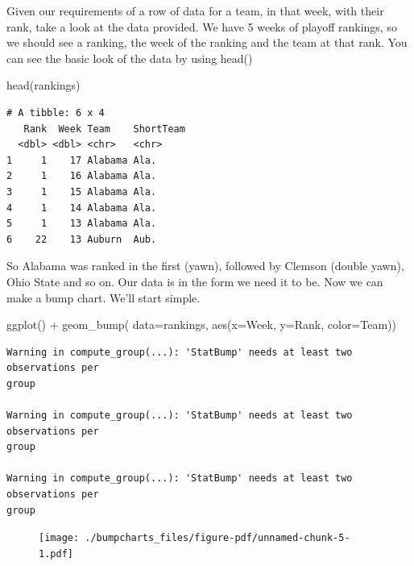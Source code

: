\documentclass[
  letterpaper,
  DIV=11,
  numbers=noendperiod]{scrreprt}
\newenvironment{Shaded}{\begin{snugshade}}{\end{snugshade}}
\newcommand{\AttributeTok}[1]{\textcolor[rgb]{0.40,0.45,0.13}{#1}}
\newcommand{\FunctionTok}[1]{\textcolor[rgb]{0.28,0.35,0.67}{#1}}
\newcommand{\NormalTok}[1]{\textcolor[rgb]{0.00,0.23,0.31}{#1}}
\newcommand{\SpecialCharTok}[1]{\textcolor[rgb]{0.37,0.37,0.37}{#1}}
\begin{document}
Given our requirements of a row of data for a team, in that week, with
their rank, take a look at the data provided. We have 5 weeks of playoff
rankings, so we should see a ranking, the week of the ranking and the
team at that rank. You can see the basic look of the data by using
head()

\begin{Shaded}
\begin{Highlighting}[]
\FunctionTok{head}\NormalTok{(rankings)}
\end{Highlighting}
\end{Shaded}

\begin{verbatim}
# A tibble: 6 x 4
   Rank  Week Team    ShortTeam
  <dbl> <dbl> <chr>   <chr>    
1     1    17 Alabama Ala.     
2     1    16 Alabama Ala.     
3     1    15 Alabama Ala.     
4     1    14 Alabama Ala.     
5     1    13 Alabama Ala.     
6    22    13 Auburn  Aub.     
\end{verbatim}

So Alabama was ranked in the first (yawn), followed by Clemson (double
yawn), Ohio State and so on. Our data is in the form we need it to be.
Now we can make a bump chart. We'll start simple.

\begin{Shaded}
\begin{Highlighting}[]
\FunctionTok{ggplot}\NormalTok{() }\SpecialCharTok{+} 
  \FunctionTok{geom\_bump}\NormalTok{(}
    \AttributeTok{data=}\NormalTok{rankings, }\FunctionTok{aes}\NormalTok{(}\AttributeTok{x=}\NormalTok{Week, }\AttributeTok{y=}\NormalTok{Rank, }\AttributeTok{color=}\NormalTok{Team))}
\end{Highlighting}
\end{Shaded}

\begin{verbatim}
Warning in compute_group(...): 'StatBump' needs at least two observations per
group

Warning in compute_group(...): 'StatBump' needs at least two observations per
group

Warning in compute_group(...): 'StatBump' needs at least two observations per
group
\end{verbatim}

\begin{figure}[H]

{\centering \texttt{[image: ./bumpcharts\_files/figure-pdf/unnamed-chunk-5-1.pdf]}

}

\end{figure}
\end{document}
